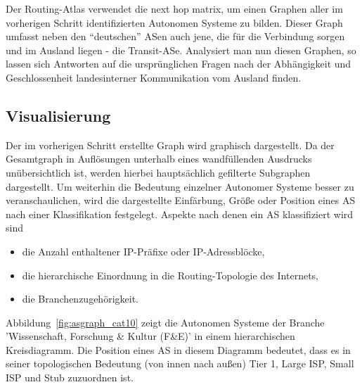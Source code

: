 Der Routing-Atlas verwendet die next hop matrix, um einen Graphen aller im vorherigen Schritt identifizierten Autonomen Systeme zu bilden.
Dieser Graph umfasst neben den "`deutschen"' ASen auch jene, die für die Verbindung sorgen und im Ausland liegen - die Transit-ASe.
Analysiert man nun diesen Graphen, so lassen sich Antworten auf die ursprünglichen Fragen nach der Abhängigkeit und Geschlossenheit landesinterner Kommunikation vom Ausland finden.


\subsection{Visualisierung}

Der im vorherigen Schritt erstellte Graph wird graphisch dargestellt.
Da der Gesamtgraph in Auflösungen unterhalb eines wandfüllenden Ausdrucks unübersichtlich ist, werden hierbei hauptsächlich gefilterte Subgraphen dargestellt.
Um weiterhin die Bedeutung einzelner Autonomer Systeme besser zu veranschaulichen, wird die dargestellte Einfärbung, Größe oder Position eines AS nach einer Klassifikation festgelegt.
Aspekte nach denen ein AS klassifiziert wird sind
\begin{itemize}
 \item die Anzahl enthaltener IP-Präfixe oder IP-Adressblöcke,
 \item die hierarchische Einordnung in die Routing-Topologie des Internets,
 \item die Branchenzugehörigkeit.
\end{itemize}

Abbildung~\ref{fig:asgraph_cat10} zeigt die Autonomen Systeme der Branche 'Wissenschaft, Forschung \& Kultur (F\&E)' in einem hierarchischen Kreisdiagramm. Die Position eines AS in diesem Diagramm bedeutet, dass es in seiner topologischen Bedeutung (von innen nach außen) Tier 1, Large ISP, Small ISP und Stub zuzuordnen ist.




